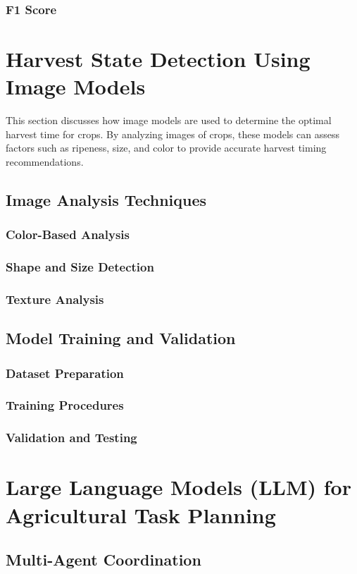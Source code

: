 \documentclass[12pt]{report}
\begin{document}
\subsection{F1 Score}

\chapter{Harvest State Detection Using Image Models}
This section discusses how image models are used to determine the optimal harvest time for crops. By analyzing images of crops, these models can assess factors such as ripeness, size, and color to provide accurate harvest timing recommendations.

\section{Image Analysis Techniques}
\subsection{Color-Based Analysis}
\subsection{Shape and Size Detection}
\subsection{Texture Analysis}

\section{Model Training and Validation}
\subsection{Dataset Preparation}
\subsection{Training Procedures}
\subsection{Validation and Testing}

\chapter{Large Language Models (LLM) for Agricultural Task Planning}
\section{Multi-Agent Coordination}
\end{document}
